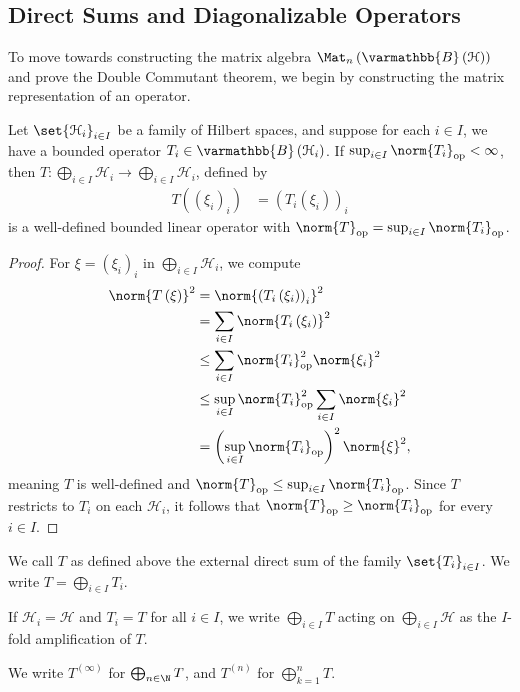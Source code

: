 \documentclass[10pt]{mypackage}
\renewcommand*{\mathbb}[1]{\varmathbb{#1}}
\newcommand{\B}{\mathbb{B}}
\begin{document}
\subsection{Direct Sums and Diagonalizable Operators}%
To move towards constructing the matrix algebra $\Mat_{n}\left(\B\left(\mathcal{H}\right)\right)$ and prove the Double Commutant theorem, we begin by constructing the matrix representation of an operator.
\begin{proposition}
  Let $\set{\mathcal{H}_{i}}_{i\in I}$ be a family of Hilbert spaces, and suppose for each $i\in I$, we have a bounded operator $T_i\in \B\left(\mathcal{H}_i\right)$. If $\sup_{i\in I}\norm{T_i}_{\text{op}} < \infty$, then $T\colon \bigoplus_{i\in I}\mathcal{H}_i \rightarrow \bigoplus_{i\in I}\mathcal{H}_i$, defined by
  \begin{align*}
    T\left(\left(\xi_i\right)_i\right) &= \left(T_i\left(\xi_i\right)\right)_{i}
  \end{align*}
  is a well-defined bounded linear operator with $\norm{T}_{\text{op}} = \sup_{i\in I}\norm{T_i}_{\text{op}}$.
\end{proposition}
\begin{proof}
  For $\xi = \left(\xi_i\right)_i$ in $\bigoplus_{i\in I}\mathcal{H}_i$, we compute
  \begin{align*}
    \norm{T\left(\xi\right)}^2 &= \norm{\left(T_i\left(\xi_i\right)\right)_i}^2\\
                               &= \sum_{i\in I}\norm{T_i\left(\xi_i\right)}^2\\
                               &\leq \sum_{i\in I}\norm{T_i}^2_{\text{op}}\norm{\xi_i}^2\\
                               &\leq \sup_{i\in I}\norm{T_i}^2_{\text{op}}\sum_{i\in I}\norm{\xi_i}^2\\
                               &= \left(\sup_{i\in I}\norm{T_i}_{\text{op}}\right)^2\norm{\xi}^2,
  \end{align*}
  meaning $T$ is well-defined and $\norm{T}_{\text{op}} \leq \sup_{i\in I}\norm{T_i}_{\text{op}}$. Since $T$ restricts to $T_i$ on each $\mathcal{H}_i$, it follows that $\norm{T}_{\text{op}} \geq \norm{T_i}_{\text{op}}$ for every $i\in I$.
\end{proof}
\begin{definition}
  We call $T$ as defined above the external direct sum of the family $\set{T_i}_{i\in I}$. We write $T = \bigoplus_{i\in I}T_i$.\newline

  If $\mathcal{H}_i = \mathcal{H}$ and $T_i = T$ for all $i\in I$, we write $\bigoplus_{i\in I}T$ acting on $\bigoplus_{i\in I}\mathcal{H}$ as the $I$-fold amplification of $T$.\newline

  We write $T^{(\infty)}$ for $\bigoplus_{n\in \N}T$, and $T^{(n)}$ for $\bigoplus_{k=1}^{n}T$.
\end{definition}
\end{document}
